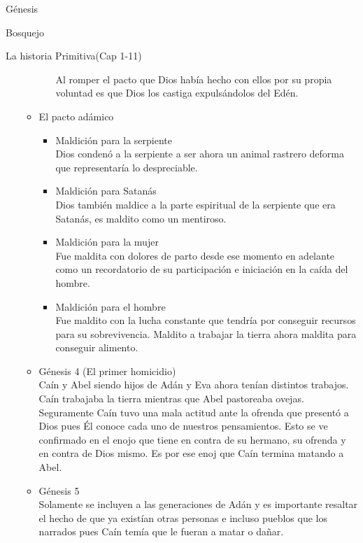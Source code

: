 \begin{section}{Génesis}
\begin{subsection}{Bosquejo}
\begin{subsubsection}{La historia Primitiva(Cap 1-11)}
\begin{enumerate}
\begin{itemize}
\begin{itemize}
					Al romper el pacto que Dios había hecho con ellos por su propia voluntad es que Dios los castiga expulsándolos del Edén.
			\end{itemize}
		\item El pacto adámico
			\begin{itemize}
				\item Maldición para la serpiente\\
					Dios condenó a la serpiente a ser ahora un animal rastrero deforma que representaría lo despreciable.
				\item Maldición para Satanás\\
					Dios también maldice a la parte espiritual de la serpiente que era Satanás, es maldito como un mentiroso.\newpage
				\item Maldición para la mujer\\
					Fue maldita con dolores de parto desde ese momento en adelante como un recordatorio de su participación e iniciación en la caída del hombre.
				\item Maldición para el hombre\\
Fue maldito con la lucha constante que tendría por conseguir recursos para su sobrevivencia. Maldito a trabajar la tierra ahora maldita para conseguir alimento.
			\end{itemize}
		\item Génesis 4 (El primer homicidio)\\
			Caín y Abel siendo hijos de Adán y Eva ahora tenían distintos trabajos. Caín trabajaba la tierra mientras que Abel pastoreaba ovejas. Seguramente Caín tuvo una mala actitud ante la ofrenda que presentó a Dios pues Él conoce cada uno de nuestros pensamientos. Esto se ve confirmado en el enojo que tiene en contra de su hermano, su ofrenda y en contra de Dios mismo. Es por ese enoj que Caín termina matando a Abel.
		\item Génesis 5\\
			Solamente se incluyen a las generaciones de Adán y es importante resaltar el hecho de que ya existían otras personas e incluso pueblos que los narrados pues Caín temía que le fueran a matar o dañar.
	\end{itemize}


\end{enumerate}
\end{subsubsection}
\end{subsection}
\end{section}
